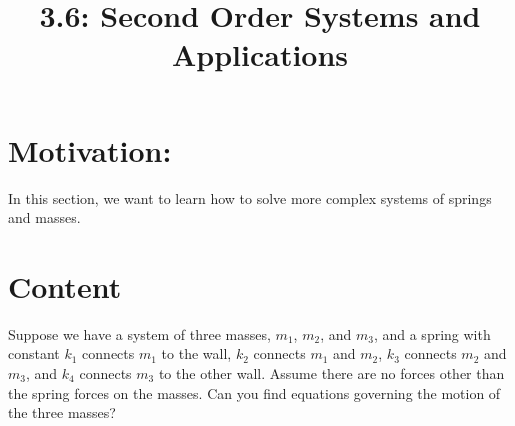 \documentclass{article}
\title{3.6: Second Order Systems and Applications}
\begin{document}
\maketitle
\section{Motivation:}
In this section, we want to learn how to solve more complex systems of springs and masses.

\section{Content}
\begin{example}
Suppose we have a system of three masses, $m_1$, $m_2$, and $m_3$, and a spring with constant $k_1$ connects $m_1$ to the wall, $k_2$ connects $m_1$ and $m_2$, $k_3$ connects $m_2$ and $m_3$, and $k_4$ connects $m_3$ to the other wall. Assume there are no forces other than the spring forces on the masses. Can you find equations governing the motion of the three masses?
\end{example}
\end{document}
